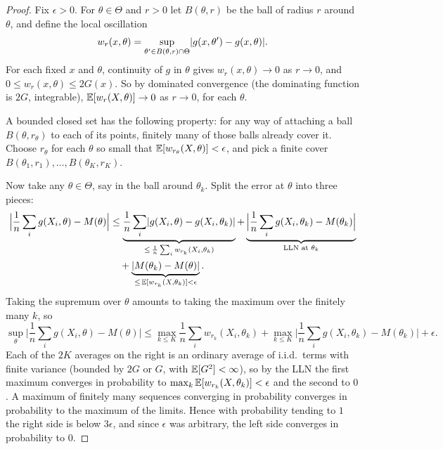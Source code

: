 \begin{proof}
Fix $\epsilon > 0$.
For $\theta \in \Theta$ and $r > 0$ let $B(\theta, r)$ be the ball of radius $r$ around $\theta$, and define the local oscillation
\[
w_r(x, \theta) = \sup_{\theta' \in B(\theta, r) \cap \Theta}\lvert g(x, \theta') - g(x, \theta)\rvert.
\]
For each fixed $x$ and $\theta$, continuity of $g$ in $\theta$ gives $w_r(x, \theta) \to 0$ as $r \to 0$, and $0 \leq w_r(x, \theta) \leq 2G(x)$.
So by dominated convergence  (the dominating function is $2G$, integrable), $\operatorname*{\mathbb{E}}[w_r(X, \theta)] \to 0$ as $r \to 0$, for each $\theta$.

A bounded closed set has the following property: for any way of attaching a ball $B(\theta, r_\theta)$ to each of its points, finitely many of those balls already cover it.
Choose $r_\theta$ for each $\theta$ so small that $\operatorname*{\mathbb{E}}[w_{r_\theta}(X, \theta)] < \epsilon$, and pick a finite cover $B(\theta_1, r_1), \ldots, B(\theta_K, r_K)$.

Now take any $\theta \in \Theta$, say in the ball around $\theta_k$. Split the error at $\theta$ into three pieces:
\[
\begin{aligned}
\Big|\frac1n\sum_i g(X_i, \theta) - M(\theta)\Big| &\leq \underbrace{\frac1n\sum_i \lvert g(X_i, \theta) - g(X_i, \theta_k)\rvert}_{\leq\, \frac1n\sum_i w_{r_k}(X_i, \theta_k)} + \underbrace{\Big|\frac1n\sum_i g(X_i, \theta_k) - M(\theta_k)\Big|}_{\text{LLN at } \theta_k}\\
&\quad + \underbrace{\lvert M(\theta_k) - M(\theta)\rvert}_{\leq\, \operatorname*{\mathbb{E}}[w_{r_k}(X, \theta_k)] < \epsilon}.
\end{aligned}
\]
Taking the supremum over $\theta$ amounts to taking the maximum over the finitely many $k$, so
\[
\sup_\theta\Big|\frac1n\sum_i g(X_i, \theta) - M(\theta)\Big| \leq \max_{k \leq K}\frac1n\sum_i w_{r_k}(X_i, \theta_k) + \max_{k \leq K}\Big|\frac1n\sum_i g(X_i, \theta_k) - M(\theta_k)\Big| + \epsilon.
\]
Each of the $2K$ averages on the right is an ordinary average of i.i.d.\ terms with finite variance (bounded by $2G$ or $G$, with $\operatorname*{\mathbb{E}}[G^2] < \infty$), so by the LLN the first maximum converges in probability to $\max_k \operatorname*{\mathbb{E}}[w_{r_k}(X, \theta_k)] < \epsilon$ and the second to $0$.
A maximum of finitely many sequences converging in probability converges in probability to the maximum of the limits.
Hence with probability tending to $1$ the right side is below $3\epsilon$, and since $\epsilon$ was arbitrary, the left side converges in probability to $0$.
\end{proof}

